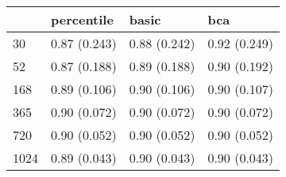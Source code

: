 \begin{tabular}{llll}
\toprule
 & percentile & basic & bca \\
\midrule
30 & 0.87 (0.243) & 0.88 (0.242) & 0.92 (0.249) \\
52 & 0.87 (0.188) & 0.89 (0.188) & 0.90 (0.192) \\
168 & 0.89 (0.106) & 0.90 (0.106) & 0.90 (0.107) \\
365 & 0.90 (0.072) & 0.90 (0.072) & 0.90 (0.072) \\
720 & 0.90 (0.052) & 0.90 (0.052) & 0.90 (0.052) \\
1024 & 0.89 (0.043) & 0.90 (0.043) & 0.90 (0.043) \\
\bottomrule
\end{tabular}
